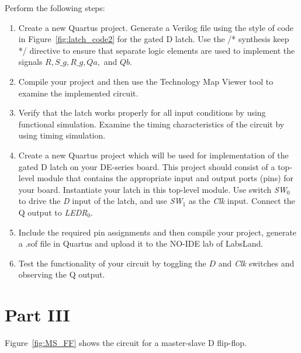 \documentclass[epsfig,10pt,fullpage]{article}
\begin{document}
Perform the following steps:
\begin{enumerate}
\item Create a new Quartus project. Generate a Verilog file using the style of code 
in Figure~\ref{fig:latch_code2} for the gated D latch. 
Use the /* synthesis keep */ directive to ensure
that separate logic elements are used to implement the signals $R, S\_g, R\_g, Qa,$ and $Qb$.
\item Compile your project and then use the 
Technology Map Viewer tool to examine the implemented circuit.
\item Verify that the latch works properly for all input conditions by using functional 
simulation. Examine the timing characteristics of the circuit by using timing simulation.
\item Create a new Quartus project which will be used for implementation of the gated D
latch on your DE-series board. This project should consist of a top-level module that 
contains the appropriate input and output ports (pins) for your board. Instantiate your
latch in this top-level module. Use switch {\it SW}$_0$ to drive the {\it D} input of the latch,
and use {\it SW}$_1$ as the {\it Clk} input. Connect the Q output to {\it LEDR}$_{0}$.
\item
Include the required pin assignments and then compile your project, generate a .sof file in Quartus and upload it to the NO-IDE lab of LabsLand.
\item
Test the functionality of your circuit by toggling the $D$ and {\it Clk} switches and observing 
the Q output.
\end{enumerate}

\section*{Part III}
Figure~\ref{fig:MS_FF} shows the circuit for a master-slave D flip-flop.
\end{document}
